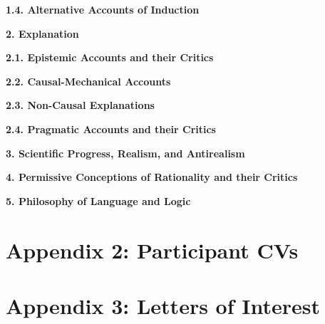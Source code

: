 \documentclass{article}[11pt]
\begin{document}
\printbibliography[keyword=IBE_Sci_Realism]

\textbf{1.4. Alternative Accounts of Induction}

\printbibliography[keyword=Induction]

\textbf{{\large 2. Explanation}}\vspace{3mm}

\textbf{2.1. Epistemic Accounts and their Critics}

\printbibliography[keyword=Epistem_Expl]

\textbf{2.2. Causal-Mechanical Accounts}

\printbibliography[keyword=Causal-Mechanical]

\textbf{2.3. Non-Causal Explanations}

\printbibliography[keyword=Non-Causal]

\textbf{2.4. Pragmatic Accounts and their Critics}

\printbibliography[keyword=Pragmatic]

\textbf{{\large 3. Scientific Progress, Realism, and Antirealism}}

\printbibliography[keyword=Realism]

\textbf{{\large 4. Permissive Conceptions of Rationality and their Critics}}

\printbibliography[keyword=permissivism]


\textbf{{\large 5. Philosophy of Language and Logic}}

\printbibliography[keyword=Language_and_Logic]


\clearpage

\section{Appendix 2: Participant CVs}





\section{Appendix 3: Letters of Interest}
\end{document}

